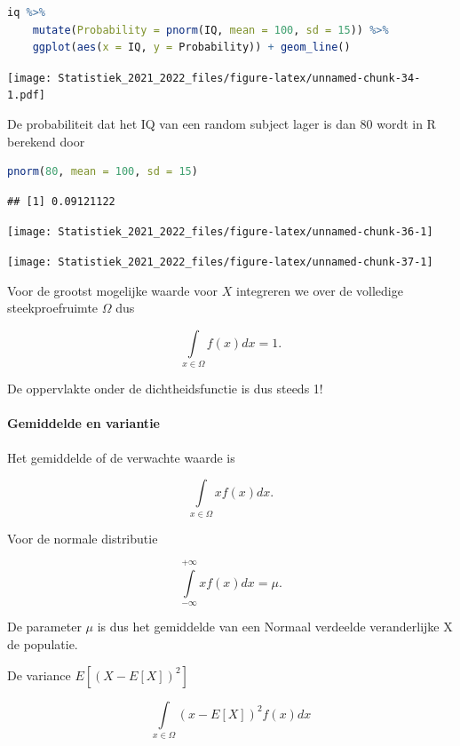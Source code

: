 \documentclass[
  12pt,dutch,coursenotes]{book}
\theoremstyle{definition}
\theoremstyle{definition}
\theoremstyle{definition}
\theoremstyle{definition}
\theoremstyle{remark}
\begin{document}
\begin{lstlisting}[language=R]
iq %>%
    mutate(Probability = pnorm(IQ, mean = 100, sd = 15)) %>%
    ggplot(aes(x = IQ, y = Probability)) + geom_line()
\end{lstlisting}

\texttt{[image: Statistiek\_2021\_2022\_files/figure-latex/unnamed-chunk-34-1.pdf]}

De probabiliteit dat het IQ van een random subject lager is dan 80 wordt in R berekend door

\begin{lstlisting}[language=R]
pnorm(80, mean = 100, sd = 15)
\end{lstlisting}

\begin{lstlisting}
## [1] 0.09121122
\end{lstlisting}

\begin{center}\texttt{[image: Statistiek\_2021\_2022\_files/figure-latex/unnamed-chunk-36-1]} \end{center}

\begin{center}\texttt{[image: Statistiek\_2021\_2022\_files/figure-latex/unnamed-chunk-37-1]} \end{center}

Voor de grootst mogelijke waarde voor \(X\) integreren we over de volledige steekproefruimte \(\Omega\) dus

\[\int \limits_{x \in \Omega} f(x) dx=1.\]

De oppervlakte onder de dichtheidsfunctie is dus steeds 1!

\hypertarget{gemiddelde-en-variantie}{%
\paragraph{Gemiddelde en variantie}\label{gemiddelde-en-variantie}}

Het gemiddelde of de verwachte waarde is

\[\int \limits_{x \in \Omega} x f(x) dx.\]

Voor de normale distributie

\[\int \limits_{-\infty}^{+\infty} x f(x) dx = \mu.\]

De parameter \(\mu\) is dus het gemiddelde van een Normaal verdeelde veranderlijke X de populatie.

De variance \(E[(X-E[X])^2]\)

\[\int \limits_{x \in \Omega} (x-E[X])^2 f(x) dx\]
\end{document}
